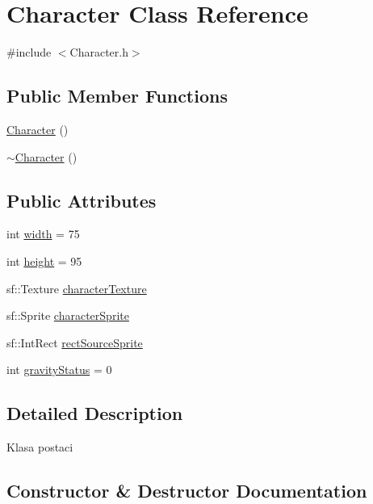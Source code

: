 \hypertarget{class_character}{}\section{Character Class Reference}
\label{class_character}


{\ttfamily \#include $<$Character.\+h$>$}

\subsection*{Public Member Functions}
\begin{DoxyCompactItemize}
\item 
\hyperlink{class_character_adc27bdd255876169bad2ed0bae0cffb5}{Character} ()
\item 
\hyperlink{class_character_a9e9be564d05ded80962b2045aa70b3fc}{$\sim$\+Character} ()
\end{DoxyCompactItemize}
\subsection*{Public Attributes}
\begin{DoxyCompactItemize}
\item 
int \hyperlink{class_character_aa945d94f4ee6ec02e5cf1fb753c94d8f}{width} = 75
\item 
int \hyperlink{class_character_a1f7e996c91a75a5e037bebcf0bf3ac06}{height} = 95
\item 
sf\+::\+Texture \hyperlink{class_character_a3880f38149ee17393273212aba865a5e}{character\+Texture}
\item 
sf\+::\+Sprite \hyperlink{class_character_af726b53a176ba8032e3a0ad28a11868c}{character\+Sprite}
\item 
sf\+::\+Int\+Rect \hyperlink{class_character_a8461b99479fbc94d4b001b61f49bcafe}{rect\+Source\+Sprite}
\item 
int \hyperlink{class_character_a40b71119c7b457c7fec3a90a012da631}{gravity\+Status} = 0
\end{DoxyCompactItemize}


\subsection{Detailed Description}
Klasa postaci 

\subsection{Constructor \& Destructor Documentation}
\mbox{\label{class_character_adc27bdd255876169bad2ed0bae0cffb5}} 
